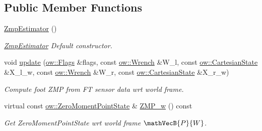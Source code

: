 \subsection*{Public Member Functions}
\begin{DoxyCompactItemize}
\item 
\hyperlink{classow__zmp_1_1ZmpEstimator_aa4679acf6b822f9bf700fed40bf63af5}{Zmp\+Estimator} ()\hypertarget{classow__zmp_1_1ZmpEstimator_aa4679acf6b822f9bf700fed40bf63af5}{}\label{classow__zmp_1_1ZmpEstimator_aa4679acf6b822f9bf700fed40bf63af5}

\begin{DoxyCompactList}\small\item\em \hyperlink{classow__zmp_1_1ZmpEstimator}{Zmp\+Estimator} Default constructor. \end{DoxyCompactList}\item 
void \hyperlink{classow__zmp_1_1ZmpEstimator_a300755b4683846754c7d108d41146b33}{update} (\hyperlink{classow__core_1_1Flags}{ow\+::\+Flags} \&flags, const \hyperlink{classow__core_1_1Wrench}{ow\+::\+Wrench} \&W\+\_\+l, const \hyperlink{classow__core_1_1CartesianState}{ow\+::\+Cartesian\+State} \&X\+\_\+l\+\_\+w, const \hyperlink{classow__core_1_1Wrench}{ow\+::\+Wrench} \&W\+\_\+r, const \hyperlink{classow__core_1_1CartesianState}{ow\+::\+Cartesian\+State} \&X\+\_\+r\+\_\+w)
\begin{DoxyCompactList}\small\item\em Compute foot Z\+MP from FT sensor data wrt world frame. \end{DoxyCompactList}\item 
virtual const \hyperlink{classow__core_1_1ZeroMomentPointState}{ow\+::\+Zero\+Moment\+Point\+State} \& \hyperlink{classow__zmp_1_1ZmpEstimator_a556315475b6d0fe976952612033f02f2}{Z\+M\+P\+\_\+w} () const 
\begin{DoxyCompactList}\small\item\em Get Zero\+Moment\+Point\+State wrt world frame $ \mathVecB{P}{W} $. \end{DoxyCompactList}\end{DoxyCompactItemize}
